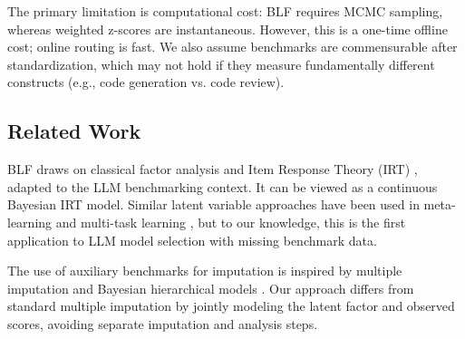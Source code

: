 The primary limitation is computational cost: BLF requires MCMC sampling, whereas weighted z-scores are instantaneous. However, this is a one-time offline cost; online routing is fast. We also assume benchmarks are commensurable after standardization, which may not hold if they measure fundamentally different constructs (e.g., code generation vs. code review).

\subsection{Related Work}

BLF draws on classical factor analysis \cite{spearman1904general} and Item Response Theory (IRT) \cite{embretson2000item}, adapted to the LLM benchmarking context. It can be viewed as a continuous Bayesian IRT model. Similar latent variable approaches have been used in meta-learning \cite{hospedales2021metalearning} and multi-task learning \cite{caruana1997multitask}, but to our knowledge, this is the first application to LLM model selection with missing benchmark data.

The use of auxiliary benchmarks for imputation is inspired by multiple imputation \cite{rubin1987multiple} and Bayesian hierarchical models \cite{gelman2006data}. Our approach differs from standard multiple imputation by jointly modeling the latent factor and observed scores, avoiding separate imputation and analysis steps.
